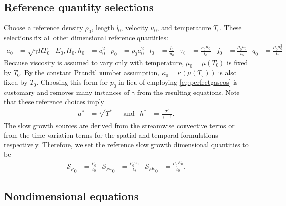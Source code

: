 \documentclass[letterpaper,11pt,nointlimits,reqno,draft]{amsbook}
\newcommand{\Ssd}{\ensuremath{\mathcal{S}}} %
\begin{document}
\subsection{Reference quantity selections}
\label{sec:nondimrefq}

Choose a reference density $\rho_{0}$, length $l_{0}$, velocity $u_{0}$, and
temperature $T_{0}$.  These selections fix all other dimensional reference
quantities:
\begin{align}
  a_{0} &= \sqrt{\gamma{}RT_{0}}
  &
  E_{0}, H_{0}, h_{0} &= a_{0}^{2}
  &
  p_{0} &= \rho_{0} a_{0}^{2}
  &
  t_{0} &= \frac{l_{0}}{u_{0}}
  &
  \tau_{0} &= \frac{\mu_{0}u_{0}}{l_{0}}
  &
  f_{0} &= \frac{\rho_{0}u_{0}}{t_{0}}
  &
  q_{0} &= \frac{\rho_{0}a_{0}^{2}}{t_{0}}
\end{align}
Because viscosity is assumed to vary only with temperature,
$\mu_{0}=\mu\!\left( T_{0} \right)$ is fixed by $T_{0}$.  By the constant
Prandtl number assumption, $\kappa_{0}=\kappa\!\left( \mu\!\left( T_{0} \right)
\right)$ is also fixed by $T_{0}$.  Choosing this form for $p_{0}$ in lieu of
employing \autoref{eq:perfectgaseos} is customary and removes many
instances of $\gamma$ from the resulting equations.  Note that these reference
choices imply
\begin{align}
a^{*}&=\sqrt{T^{*}}
&
&\text{and}
&
h^{*}&=\frac{T^{*}}{\gamma-1}
.
\end{align}
The slow growth sources are derived from the streamwise convective terms or
from the time variation terms for the spatial and temporal formulations
respectively. Therefore, we set the reference slow growth dimensional quantities
to be
\begin{align}
  \label{eq:slowgrowthrefs}
  {\Ssd_{\rho}}_0 &= \frac{\rho_{0}}{t_0}
  &
  {\Ssd_{\rho u}}_0 &= \frac{\rho_{0} u_0}{t_0}
  &
  {\Ssd_{\rho E}}_0 &= \frac{\rho_{0} E_0}{t_0}.
\end{align}


\subsection{Nondimensional equations}
\label{sec:nondim_equations}
\end{document}
